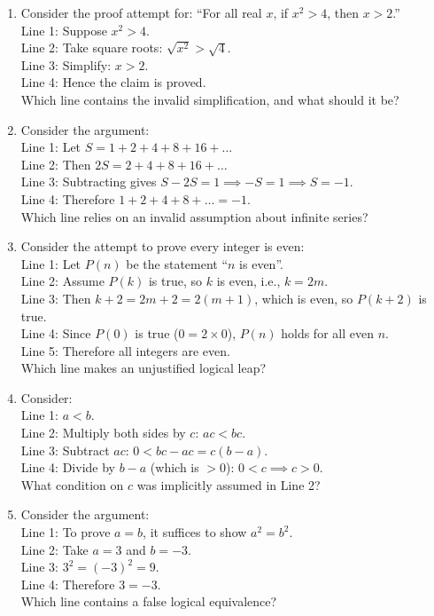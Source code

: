 \documentclass[11pt,a4paper]{article}
\begin{document}
\begin{enumerate}
\item Consider the proof attempt for: ``For all real $x$, if $x^2 > 4$, then $x > 2$.''\\
Line 1: Suppose $x^2 > 4$.\\
Line 2: Take square roots: $\sqrt{x^2} > \sqrt{4}$.\\
Line 3: Simplify: $x > 2$.\\
Line 4: Hence the claim is proved.\\
Which line contains the invalid simplification, and what should it be?

\item Consider the argument:\\
Line 1: Let $S = 1 + 2 + 4 + 8 + 16 + \dots$\\
Line 2: Then $2S = 2 + 4 + 8 + 16 + \dots$\\
Line 3: Subtracting gives $S - 2S = 1 \implies -S = 1 \implies S = -1$.\\
Line 4: Therefore $1 + 2 + 4 + 8 + \dots = -1$.\\
Which line relies on an invalid assumption about infinite series?

\item Consider the attempt to prove every integer is even:\\
Line 1: Let $P(n)$ be the statement ``$n$ is even''.\\
Line 2: Assume $P(k)$ is true, so $k$ is even, i.e., $k = 2m$.\\
Line 3: Then $k+2 = 2m+2 = 2(m+1)$, which is even, so $P(k+2)$ is true.\\
Line 4: Since $P(0)$ is true ($0 = 2 \times 0$), $P(n)$ holds for all even $n$.\\
Line 5: Therefore all integers are even.\\
Which line makes an unjustified logical leap?

\item Consider:\\
Line 1: $a < b$.\\
Line 2: Multiply both sides by $c$: $ac < bc$.\\
Line 3: Subtract $ac$: $0 < bc - ac = c(b-a)$.\\
Line 4: Divide by $b-a$ (which is $>0$): $0 < c \implies c > 0$.\\
What condition on $c$ was implicitly assumed in Line 2?

\item Consider the argument:\\
Line 1: To prove $a=b$, it suffices to show $a^2 = b^2$.\\
Line 2: Take $a = 3$ and $b = -3$.\\
Line 3: $3^2 = (-3)^2 = 9$.\\
Line 4: Therefore $3 = -3$.\\
Which line contains a false logical equivalence?


\end{enumerate}
\end{document}
